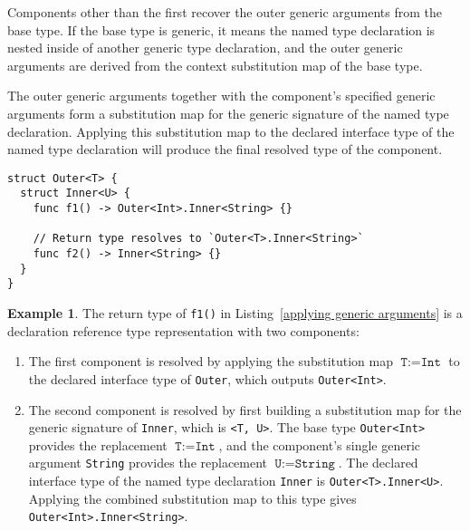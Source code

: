 \documentclass[a4paper,headsepline,bibliography=totoc,toc=flat,fleqn,twoside=semi]{scrbook}
\theoremstyle{definition}
\theoremstyle{definition}
\newtheorem{example}{Example}[chapter]
\theoremstyle{definition}
\begin{document}
Components other than the first recover the outer generic arguments from the base type. If the base type is generic, it means the named type declaration is nested inside of another generic type declaration, and the outer generic arguments are derived from the context substitution map of the base type.

The outer generic arguments together with the component's specified generic arguments form a substitution map for the generic signature of the named type declaration. Applying this substitution map to the declared interface type of the named type declaration will produce the final resolved type of the component.

\begin{listing}\label{applying generic arguments}
\begin{Verbatim}
struct Outer<T> {
  struct Inner<U> {
    func f1() -> Outer<Int>.Inner<String> {}

    // Return type resolves to `Outer<T>.Inner<String>`
    func f2() -> Inner<String> {}
  }
}
\end{Verbatim}
\end{listing}
\begin{example} The return type of \texttt{f1()} in Listing~\ref{applying generic arguments} is a declaration reference type representation with two components:
\begin{enumerate}
\item The first component is resolved by applying the substitution map $\texttt{T}:=\texttt{Int}$ to the declared interface type of \texttt{Outer}, which outputs \texttt{Outer<Int>}.
\item The second component is resolved by first building a substitution map for the generic signature of \texttt{Inner}, which is \texttt{<T,~U>}. The base type \texttt{Outer<Int>} provides the replacement $\texttt{T}:=\texttt{Int}$, and the component's single generic argument \texttt{String} provides the replacement $\texttt{U}:=\texttt{String}$. The declared interface type of the named type declaration \texttt{Inner} is \texttt{Outer<T>.Inner<U>}. Applying the combined substitution map to this type gives \texttt{Outer<Int>.Inner<String>}.
\end{enumerate}

\end{example}
\end{document}
